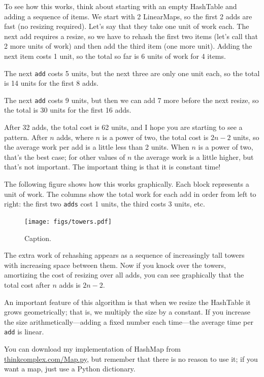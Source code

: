 \documentclass[10pt]{book}
\begin{document}
To see how this works, think about starting with an empty
HashTable and adding a sequence of items.  We start with 2 LinearMaps,
so the first 2 adds are fast (no resizing required).  Let's
say that they take one unit of work each.  The next add
requires a resize, so we have to rehash the first two
items (let's call that 2 more units of work) and then
add the third item (one more unit).  Adding the next item
costs 1 unit, so the total so far is
6 units of work for 4 items.

The next {\tt add} costs 5 units, but the next three
are only one unit each, so the total is 14 units for the
first 8 adds.

The next {\tt add} costs 9 units, but then we can add 7 more
before the next resize, so the total is 30 units for the
first 16 adds.

After 32 adds, the total cost is 62 units, and I hope you are starting
to see a pattern.  After $n$ adds, where $n$ is a power of two, the
total cost is $2n - 2$ units, so the average work per add is
a little less than 2 units.  When $n$ is a power of two, that's
the best case; for other values of $n$ the average work is a little
higher, but that's not important.  The important thing is that it
is constant time!

The following figure shows how this works graphically.  Each
block represents a unit of work.  The columns show the total
work for each add in order from left to right: the first two
{\tt adds} cost 1 units, the third costs 3 units, etc.

\begin{figure}
\centerline{\texttt{[image: figs/towers.pdf]}}
\caption{Caption.}
\end{figure}

The extra work of rehashing appears as a sequence of increasingly
tall towers with increasing space between them.  Now if you knock
over the towers, amortizing the cost of resizing over all
adds, you can see graphically that the total cost after $n$
adds is $2n - 2$.

An important feature of this algorithm is that when we resize the
HashTable it grows geometrically; that is, we multiply the size by a
constant.  If you increase the size
arithmetically---adding a fixed number each time---the average time
per {\tt add} is linear.

You can download my implementation of HashMap from
\url{thinkcomplex.com/Map.py}, but remember that there
is no reason to use it; if you want a map, just use a Python dictionary.
\end{document}

